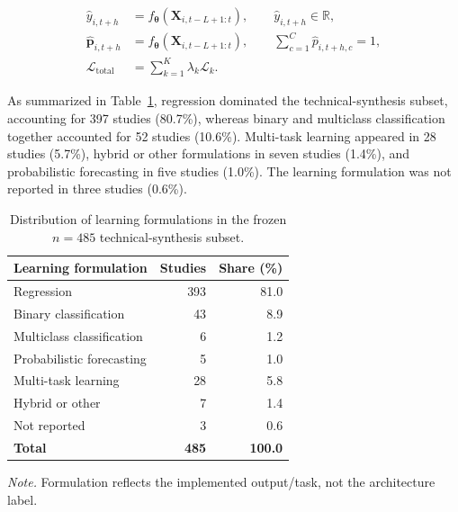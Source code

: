 \documentclass[pdflatex,sn-mathphys-num]{sn-jnl}%
\theoremstyle{thmstyleone}%
\theoremstyle{thmstyletwo}%
\theoremstyle{thmstylethree}%
\begin{document}
\begin{align}
\widehat{y}_{i,t+h}
&=
f_{\boldsymbol{\theta}}
\left(
\mathbf{X}_{i,t-L+1:t}
\right),
\qquad
\widehat{y}_{i,t+h}\in\mathbb{R},
\label{eq:regression-formulation}\\
\widehat{\mathbf{p}}_{i,t+h}
&=
f_{\boldsymbol{\theta}}
\left(
\mathbf{X}_{i,t-L+1:t}
\right),
\qquad
\sum_{c=1}^{C}
\widehat{p}_{i,t+h,c}=1,
\label{eq:classification-formulation}\\
\mathcal{L}_{\mathrm{total}}
&=
\sum_{k=1}^{K}
\lambda_k\mathcal{L}_{k}.
\label{eq:multitask-formulation}
\end{align}

As summarized in Table~\ref{tab:learning-formulation}, regression
dominated the technical-synthesis subset, accounting for 397 studies
(80.7\%), whereas binary and multiclass classification together
accounted for 52 studies (10.6\%). Multi-task learning appeared in
28 studies (5.7\%), hybrid or other formulations in seven studies
(1.4\%), and probabilistic forecasting in five studies (1.0\%).
The learning formulation was not reported in three studies (0.6\%).

\begin{table}[!htbp]
\centering
\caption{Distribution of learning formulations in the frozen $n=485$ technical-synthesis subset.}
\label{tab:learning-formulation}
\small
\setlength{\tabcolsep}{4pt}
\renewcommand{\arraystretch}{1.12}
\begin{tabular}{lrr}
\toprule
Learning formulation & Studies & Share (\%) \\
\midrule
Regression & 393 & 81.0 \\
Binary classification & 43 & 8.9 \\
Multiclass classification & 6 & 1.2 \\
Probabilistic forecasting & 5 & 1.0 \\
Multi-task learning & 28 & 5.8 \\
Hybrid or other & 7 & 1.4 \\
Not reported & 3 & 0.6 \\
\textbf{Total} & \textbf{485} & \textbf{100.0} \\
\bottomrule
\end{tabular}

\vspace{1mm}
\begin{minipage}{0.97\linewidth}
\footnotesize
\textit{Note.} Formulation reflects the implemented output/task, not the architecture label.
\end{minipage}
\end{table}
\end{document}
